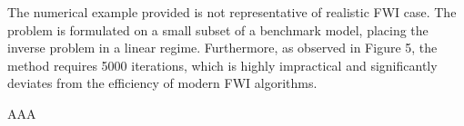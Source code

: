 \begin{point}
	The numerical example provided is not representative of realistic FWI case. The problem is formulated on a small subset of a benchmark model, placing the inverse problem in a linear regime. Furthermore, as observed in Figure 5, the method requires 5000 iterations, which is highly impractical and significantly deviates from the efficiency of modern FWI algorithms.
\end{point}

\begin{reply}
	AAA
	
\end{reply}